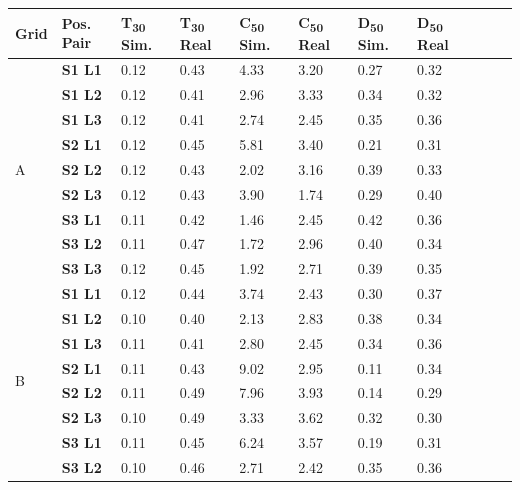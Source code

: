 \begin{table}[]
\centering
\begin{tabular}{@{}lllllllllll@{}}
\toprule
  Grid & 
  Pos. Pair &
  T\textsubscript{30} Sim. &
  T\textsubscript{30} Real &
  C\textsubscript{50} Sim.  &
  C\textsubscript{50} Real &
  D\textsubscript{50} Sim. &
  D\textsubscript{50} Real \\ \midrule
\multirow{9}{*}{A} & \textbf{S1 L1}      & 0.12 & 0.43 & 4.33 & 3.20 & 0.27 & 0.32 \\
                        & \textbf{S1 L2} & 0.12 & 0.41 & 2.96 & 3.33 & 0.34 & 0.32 \\
                        & \textbf{S1 L3} & 0.12 & 0.41 & 2.74 & 2.45 & 0.35 & 0.36 \\
                        & \textbf{S2 L1} & 0.12 & 0.45 & 5.81 & 3.40 & 0.21 & 0.31 \\
                        & \textbf{S2 L2} & 0.12 & 0.43 & 2.02 & 3.16 & 0.39 & 0.33 \\
                        & \textbf{S2 L3} & 0.12 & 0.43 & 3.90 & 1.74 & 0.29 & 0.40 \\
                        & \textbf{S3 L1} & 0.11 & 0.42 & 1.46 & 2.45 & 0.42 & 0.36 \\
                        & \textbf{S3 L2} & 0.11 & 0.47 & 1.72 & 2.96 & 0.40 & 0.34 \\
                        & \textbf{S3 L3} & 0.12 & 0.45 & 1.92 & 2.71 & 0.39 & 0.35 \\ \cmidrule(l){1-8}
\multirow{9}{*}{B} & \textbf{S1 L1}      & 0.12 & 0.44 & 3.74 & 2.43 & 0.30 & 0.37 \\
                        & \textbf{S1 L2} & 0.10 & 0.40 & 2.13 & 2.83 & 0.38 & 0.34 \\
                        & \textbf{S1 L3} & 0.11 & 0.41 & 2.80 & 2.45 & 0.34 & 0.36 \\
                        & \textbf{S2 L1} & 0.11 & 0.43 & 9.02 & 2.95 & 0.11 & 0.34 \\
                        & \textbf{S2 L2} & 0.11 & 0.49 & 7.96 & 3.93 & 0.14 & 0.29 \\
                        & \textbf{S2 L3} & 0.10 & 0.49 & 3.33 & 3.62 & 0.32 & 0.30 \\
                        & \textbf{S3 L1} & 0.11 & 0.45 & 6.24 & 3.57 & 0.19 & 0.31 \\
                        & \textbf{S3 L2} & 0.10 & 0.46 & 2.71 & 2.42 & 0.35 & 0.36 \\

\end{tabular}
\end{table}
